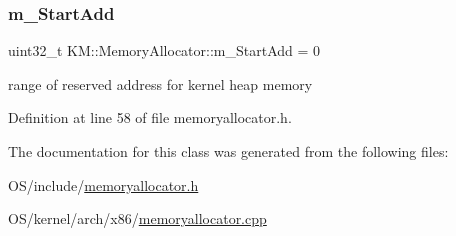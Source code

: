 \subsubsection{\texorpdfstring{m\+\_\+\+Start\+Add}{m\_StartAdd}}
{\footnotesize\ttfamily uint32\+\_\+t K\+M\+::\+Memory\+Allocator\+::m\+\_\+\+Start\+Add = 0}



range of reserved address for kernel heap memory 



Definition at line 58 of file memoryallocator.\+h.



The documentation for this class was generated from the following files\+:\begin{DoxyCompactItemize}
\item 
O\+S/include/\hyperlink{memoryallocator_8h}{memoryallocator.\+h}\item 
O\+S/kernel/arch/x86/\hyperlink{memoryallocator_8cpp}{memoryallocator.\+cpp}\end{DoxyCompactItemize}
